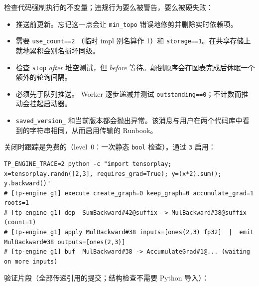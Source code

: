 检查代码强制执行的不变量；违规行为要么被警告，要么被硬失败：

\begin{itemize}[leftmargin=1.2em]
\item 推送前更新。忘记这一点会让 \texttt{min\_topo} 错误地修剪并删除实时依赖项。
\item 需要 \texttt{use\_count==2} （临时 impl 别名算作 1）和 \texttt{storage==1}。在共享存储上就地累积会别名损坏同级。
\item 检查 \texttt{stop} \emph{after} 堆空测试，但 \emph{before} 等待。颠倒顺序会在图表完成后休眠一个额外的轮询间隔。
\item 必须先于队列推送。 Worker 逐步递减并测试 \texttt{outstanding==0}；不计数而推动会挂起启动器。
\item \texttt{saved\_version\_} 和当前版本都会抛出异常。该消息与用户在两个代码库中看到的字符串相同，从而启用传输的 Runbook。
\end{itemize}

关闭时跟踪是免费的（level~0：一次静态 \texttt{bool} 检查）。通过 \texttt{3} 启用：

\begin{lstlisting}[caption={Engine tracing (zero cost when off).}, label=lst:trace]
TP_ENGINE_TRACE=2 python -c "import tensorplay; x=tensorplay.randn([2,3], requires_grad=True); y=(x*2).sum(); y.backward()"
# [tp-engine g1] execute create_graph=0 keep_graph=0 accumulate_grad=1 roots=1
# [tp-engine g1] dep  SumBackward#42@suffix -> MulBackward#38@suffix (count=1)
# [tp-engine g1] apply MulBackward#38 inputs=[ones(2,3) fp32]  |  emit MulBackward#38 outputs=[ones(2,3)]
# [tp-engine g1] buf  MulBackward#38 -> AccumulateGrad#1@... (waiting on more inputs)
\end{lstlisting}

验证片段（全部传递引用的提交；结构检查不需要 Python 导入）：

